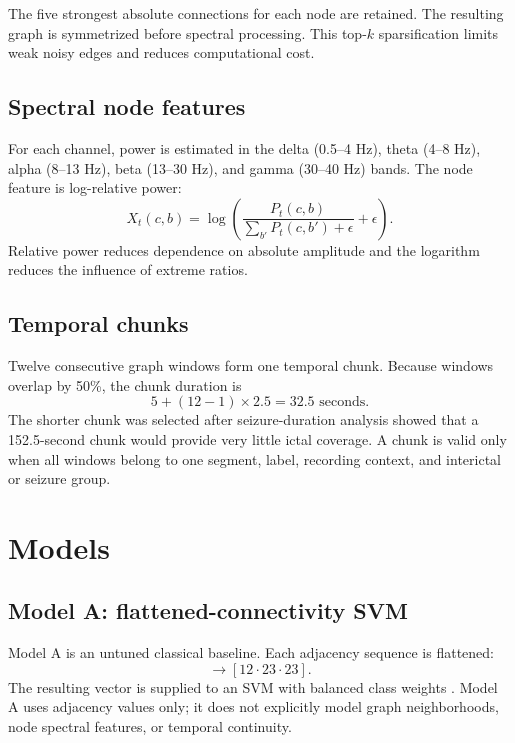 \documentclass[conference]{IEEEtran}
\begin{document}
The five strongest absolute connections for each node are retained. The resulting graph is symmetrized before spectral processing. This top-$k$ sparsification limits weak noisy edges and reduces computational cost.

\subsection{Spectral node features}
For each channel, power is estimated in the delta (0.5--4 Hz), theta (4--8 Hz), alpha (8--13 Hz), beta (13--30 Hz), and gamma (30--40 Hz) bands. The node feature is log-relative power:
\begin{equation}
 X_t(c,b) = \log\left(\frac{P_t(c,b)}{\sum_{b'}P_t(c,b')+\epsilon}+\epsilon\right).
\end{equation}
Relative power reduces dependence on absolute amplitude and the logarithm reduces the influence of extreme ratios.

\subsection{Temporal chunks}
Twelve consecutive graph windows form one temporal chunk. Because windows overlap by 50\%, the chunk duration is
\begin{equation}
 5 + (12-1)\times2.5 = 32.5\text{ seconds}.
\end{equation}
The shorter chunk was selected after seizure-duration analysis showed that a 152.5-second chunk would provide very little ictal coverage. A chunk is valid only when all windows belong to one segment, label, recording context, and interictal or seizure group.

\section{Models}
\subsection{Model A: flattened-connectivity SVM}
Model A is an untuned classical baseline. Each adjacency sequence is flattened:
\begin{equation}
 [12,23,23] \rightarrow [12\cdot23\cdot23].
\end{equation}
The resulting vector is supplied to an SVM with balanced class weights \cite{cortes1995svm,pedregosa2011sklearn}. Model A uses adjacency values only; it does not explicitly model graph neighborhoods, node spectral features, or temporal continuity.
\end{document}

